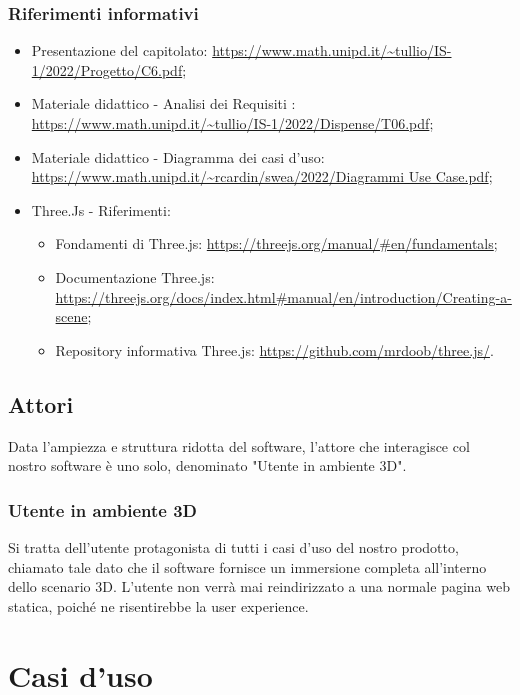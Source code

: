 \subsubsection{Riferimenti informativi}
\begin{itemize}
\item Presentazione del capitolato: \url{https://www.math.unipd.it/~tullio/IS-1/2022/Progetto/C6.pdf};
\item Materiale didattico - Analisi dei Requisiti : \url{https://www.math.unipd.it/~tullio/IS-1/2022/Dispense/T06.pdf};
\item Materiale didattico - Diagramma dei casi d’uso: \url{https://www.math.unipd.it/~rcardin/swea/2022/Diagrammi Use Case.pdf};
\item Three.Js - Riferimenti:
\begin{itemize}
\item Fondamenti di Three.js: \url{https://threejs.org/manual/#en/fundamentals};
\item Documentazione Three.js: \url{https://threejs.org/docs/index.html#manual/en/introduction/Creating-a-scene};
\item Repository informativa Three.js: \url{https://github.com/mrdoob/three.js/}.
\end{itemize} 
\end{itemize}

\subsection{Attori}
Data l'ampiezza e struttura ridotta del software, l'attore che interagisce col nostro software è uno solo, denominato "Utente in ambiente 3D". 

\subsubsection{Utente in ambiente 3D}
Si tratta dell'utente protagonista di tutti i casi d'uso del nostro prodotto, chiamato tale dato che il software fornisce un immersione completa all'interno dello scenario 3D. \newline
L'utente non verrà mai reindirizzato a una normale pagina web statica, poiché ne risentirebbe la user experience. 

\pagebreak

\section{Casi d'uso}

